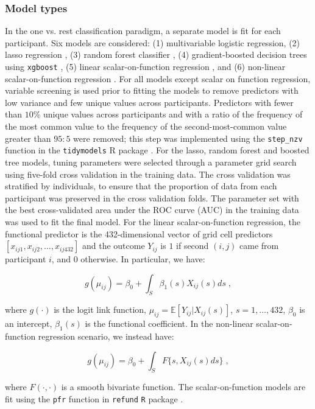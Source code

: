 \subsubsection{Model types}\label{subsubsec:modeltypes}
In the one vs. rest classification paradigm, a separate model is fit for each participant. Six models are considered: (1) multivariable logistic regression, (2) lasso regression \citep{lasso}, (3) random forest classifier \citep{Breiman2001}, (4) gradient-boosted decision trees \citep{gradboost} using \texttt{xgboost} \citep{xgb}, (5) linear scalar-on-function regression \citep{sofr}, and (6) non-linear scalar-on-function regression \citep{sofr}. For all models except scalar on function regression, variable screening is used prior to fitting the models to remove predictors with low variance and few unique values across participants. Predictors with fewer than $10$\%  unique values across participants and with a ratio of the frequency of the most common value to the frequency of the second-most-common value greater than $95:5$ were removed; this step was implemented using the \texttt{step\_nzv} function in the \texttt{tidymodels} R package \citep{tidymodels}. For the lasso, random forest and boosted tree models, tuning parameters were selected through a parameter grid search using five-fold cross validation in the training data. The cross validation was stratified by individuals, to ensure that the proportion of data from each participant was preserved in the cross validation folds.  The parameter set with the best cross-validated area under the ROC curve (AUC) in the training data was used to fit the final model. For the linear scalar-on-function regression, the functional predictor is the 432-dimensional vector of grid cell predictors $[x_{ij1}, x_{ij2}, \dots, x_{ij432}]$ and the outcome $Y_{ij}$ is $1$ if second $(i,j)$ came from participant $i$, and $0$ otherwise. In particular, we have: 

$$g(\mu_{ij}) = \beta_0 + \int_S \beta_1(s)X_{ij}(s)ds\;, $$

\noindent where $g(\cdot)$ is the logit link function, $\mu_{ij} = \mathbb{E}[Y_{ij} | X_{ij}(s)]$,  $s = 1, \dots, 432$, $\beta_0$ is an intercept, $\beta_1(s)$ is the functional coefficient. 
In the non-linear scalar-on-function regression scenario, we instead have:

$$g(\mu_{ij}) = \beta_0 + \int_S F\{s,X_{ij}(s)ds\}\;,$$

\noindent where $F(\cdot,\cdot)$ is a smooth bivariate function. The scalar-on-function models are fit using the \texttt{pfr} function in \texttt{refund} \texttt{R} package \citep{refund}.

